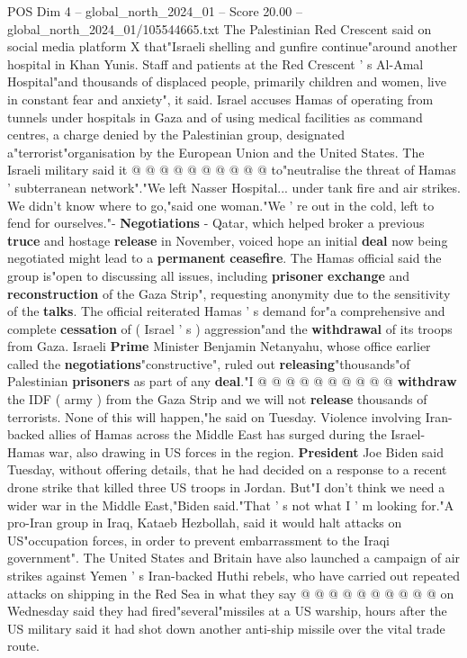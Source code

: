 \begin{textsample}{POS Dim 4 – global\_north\_2024\_01 – Score 20.00 – global\_north\_2024\_01/105544665.txt}
The Palestinian Red Crescent said on social media platform X that"Israeli shelling and gunfire continue"around another hospital in Khan Yunis.
Staff and patients at the Red Crescent ' s Al-Amal Hospital"and thousands of displaced people, primarily children and women, live in constant fear and anxiety", it said.
Israel accuses Hamas of operating from tunnels under hospitals in Gaza and of using medical facilities as command centres, a charge denied by the Palestinian group, designated a"terrorist"organisation by the European Union and the United States.
The Israeli military said it @ @ @ @ @ @ @ @ @ @ to"neutralise the threat of Hamas ' subterranean network"."We left Nasser Hospital... under tank fire and air strikes.
We didn't know where to go,"said one woman."We ' re out in the cold, left to fend for ourselves."- \textbf{Negotiations} - Qatar, which helped broker a previous \textbf{truce} and hostage \textbf{release} in November, voiced hope an initial \textbf{deal} now being negotiated might lead to a \textbf{permanent} \textbf{ceasefire}.
The Hamas official said the group is"open to discussing all issues, including \textbf{prisoner} \textbf{exchange} and \textbf{reconstruction} of the Gaza Strip", requesting anonymity due to the sensitivity of the \textbf{talks}.
The official reiterated Hamas ' s demand for"a comprehensive and complete \textbf{cessation} of ( Israel ' s ) aggression"and the \textbf{withdrawal} of its troops from Gaza.
Israeli \textbf{Prime} Minister Benjamin Netanyahu, whose office earlier called the \textbf{negotiations}"constructive", ruled out \textbf{releasing}"thousands"of Palestinian \textbf{prisoners} as part of any \textbf{deal}."I @ @ @ @ @ @ @ @ @ @ \textbf{withdraw} the IDF ( army ) from the Gaza Strip and we will not \textbf{release} thousands of terrorists.
None of this will happen,"he said on Tuesday.
Violence involving Iran-backed allies of Hamas across the Middle East has surged during the Israel-Hamas war, also drawing in US forces in the region. \textbf{President} Joe Biden said Tuesday, without offering details, that he had decided on a response to a recent drone strike that killed three US troops in Jordan.
But"I don't think we need a wider war in the Middle East,"Biden said."That ' s not what I ' m looking for."A pro-Iran group in Iraq, Kataeb Hezbollah, said it would halt attacks on US"occupation forces, in order to prevent embarrassment to the Iraqi government".
The United States and Britain have also launched a campaign of air strikes against Yemen ' s Iran-backed Huthi rebels, who have carried out repeated attacks on shipping in the Red Sea in what they say @ @ @ @ @ @ @ @ @ @ on Wednesday said they had fired"several"missiles at a US warship, hours after the US military said it had shot down another anti-ship missile over the vital trade route.

\end{textsample}
